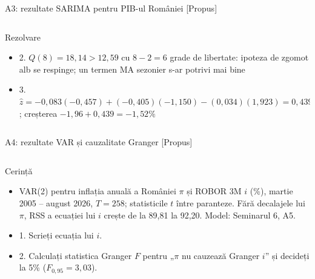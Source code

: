 \begin{frame}{A3: rezultate SARIMA pentru PIB-ul României [Propus]}
\begin{columns}[T]
\begin{column}{\solw}
{\begin{exampleblock}{Rezolvare}
\begin{itemize}
    \item 2. $Q(8) = 18{,}14 > 12{,}59$ cu $8 - 2 = 6$ grade de libertate: ipoteza de zgomot alb se respinge; un termen MA sezonier s-ar potrivi mai bine
    \item 3. $\hat z = \ensuremath{-}0{,}083(\ensuremath{-}0{,}457) + (\ensuremath{-}0{,}405)(\ensuremath{-}1{,}150) - (0{,}034)(1{,}923) = 0{,}439$; creșterea $\ensuremath{-}1{,}96 + 0{,}439 = \ensuremath{-}1{,}52\%$
\end{itemize}
\end{exampleblock}
}
\end{column}
\end{columns}
\end{frame}

\begin{frame}{A4: rezultate VAR și cauzalitate Granger [Propus]}
\propsub
\itemsize{\scriptsize}
\begin{columns}[T]
\begin{column}{\taskw}
\begin{block}{Cerință}
\begin{center}
\scriptsize
{}
\end{center}
\begin{itemize}
    \item VAR(2) pentru inflația anuală a României $\pi$ și ROBOR 3M $i$ (\%), martie 2005 -- august 2026, $T = 258$; statisticile $t$ între paranteze. Fără decalajele lui $\pi$, RSS a ecuației lui $i$ crește de la 89{,}81 la 92{,}20. Model: Seminarul 6, A5.
    \item 1. Scrieți ecuația lui $i$.
    \item 2. Calculați statistica Granger $F$ pentru „$\pi$ nu cauzează Granger $i$” și decideți la 5\% ($F_{0,95} = 3{,}03$).

\end{itemize}
\end{block}
\end{column}
\end{columns}
\end{frame}
